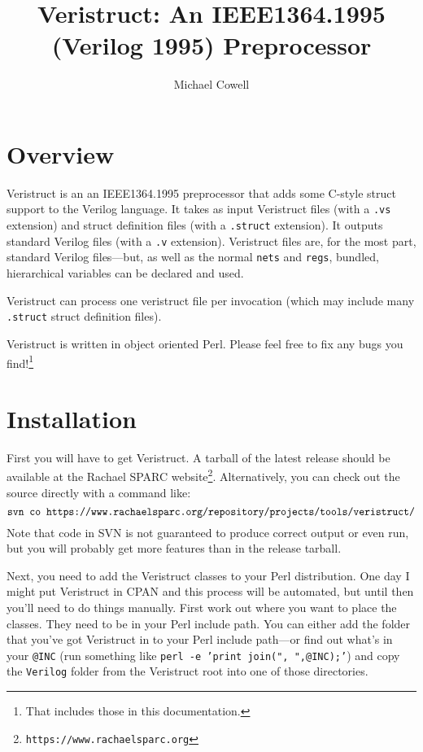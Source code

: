 \documentclass[a4paper]{article} \usepackage[dvips]{graphicx}
\begin{document}
\author{Michael Cowell} \title{Veristruct: An IEEE1364.1995 (Verilog
  1995) Preprocessor}
\maketitle{}
\section{Overview}
\label{sec:overview}
Veristruct is an an IEEE1364.1995 preprocessor that adds some C-style
struct support to the Verilog language. It takes as input Veristruct
files (with a \texttt{.vs} extension) and struct definition files
(with a \texttt{.struct} extension). It outputs standard Verilog files
(with a \texttt{.v} extension). Veristruct files are, for the most
part, standard Verilog files---but, as well as the normal
\texttt{nets} and \texttt{regs}, bundled, hierarchical variables can
be declared and used.

Veristruct can process one veristruct file per invocation (which may
include many \texttt{.struct} struct definition files).

Veristruct is written in object oriented Perl. Please feel free to fix
any bugs you find!\footnote{That includes those in this
  documentation.}

\section{Installation}
\label{sec:installation}
First you will have to get Veristruct. A tarball of the latest release
should be available at the Rachael SPARC
website\footnote{\texttt{https://www.rachaelsparc.org}}.
Alternatively, you can check out the source directly with a command
like:
$$\hbox{\texttt{svn co 
    https://www.rachaelsparc.org/repository/projects/tools/veristruct/}}$$
Note that code in SVN is not guaranteed to produce correct output or
even run, but you will probably get more features than in the release
tarball.

Next, you need to add the Veristruct classes to your Perl
distribution.  One day I might put Veristruct in CPAN and this process
will be automated, but until then you'll need to do things
manually. First work out where you want to place the classes. They
need to be in your Perl include path. You can either add the folder
that you've got Veristruct in to your Perl include path---or find out
what's in your \texttt{@INC} (run something like \texttt{perl -e
  'print join(", ",@INC);'}) and copy the \texttt{Verilog} folder from
the Veristruct root into one of those directories.
\end{document}
